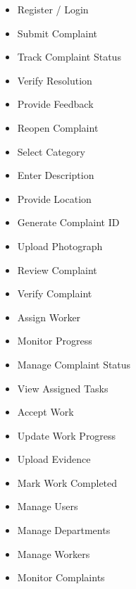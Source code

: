 \documentclass[12pt,a4paper]{article}
\begin{document}
\begin{itemize}[leftmargin=*]

\item Register / Login

\item Submit Complaint

\item Track Complaint Status

\item Verify Resolution

\item Provide Feedback

\item Reopen Complaint

\item Select Category

\item Enter Description

\item Provide Location

\item Generate Complaint ID

\item Upload Photograph

\item Review Complaint

\item Verify Complaint

\item Assign Worker

\item Monitor Progress

\item Manage Complaint Status

\item View Assigned Tasks

\item Accept Work

\item Update Work Progress

\item Upload Evidence

\item Mark Work Completed

\item Manage Users

\item Manage Departments

\item Manage Workers

\item Monitor Complaints

\end{itemize}
\end{document}
